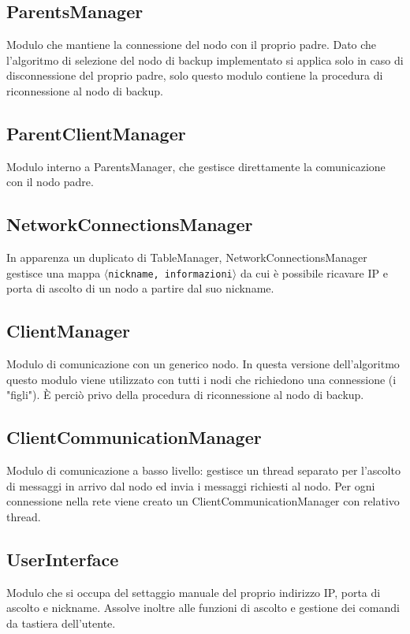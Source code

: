 \documentclass[10pt]{article} %
\begin{document}
\subsection{ParentsManager}
	Modulo che mantiene la connessione del nodo con il proprio padre. Dato che l'algoritmo di selezione del nodo di backup implementato si applica solo in caso di disconnessione del proprio padre, solo questo modulo contiene la procedura di riconnessione al nodo di backup.

\subsection{ParentClientManager}
	Modulo interno a ParentsManager, che gestisce direttamente la comunicazione con il nodo padre.

\subsection{NetworkConnectionsManager}
	In apparenza un duplicato di TableManager, NetworkConnectionsManager gestisce una mappa $\langle${\tt nickname, informazioni}$\rangle$ da cui è possibile ricavare IP e porta di ascolto di un nodo a partire dal suo nickname.

\subsection{ClientManager}
	Modulo di comunicazione con un generico nodo. In questa versione dell'algoritmo questo modulo viene utilizzato con tutti i nodi che richiedono una connessione (i "figli"). \`E perciò privo della procedura di riconnessione al nodo di backup.

\subsection{ClientCommunicationManager}
	Modulo di comunicazione a basso livello: gestisce un thread separato per l'ascolto di messaggi in arrivo dal nodo ed invia i messaggi richiesti al nodo. Per ogni connessione nella rete viene creato un ClientCommunicationManager con relativo thread.

\subsection{UserInterface}
	Modulo che si occupa del settaggio manuale del proprio indirizzo IP, porta di ascolto e nickname. Assolve inoltre alle funzioni di ascolto e gestione dei comandi da tastiera dell'utente.
\end{document}
